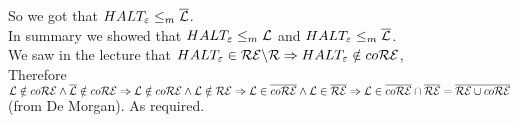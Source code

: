 So we got that \underline{$HALT_\varepsilon \leq_m \overline{\mathcal{L}}$}. \\

In summary we showed that $HALT_\varepsilon \leq_m \mathcal{L}$ and $HALT_\varepsilon \leq_m \overline{\mathcal{L}}$. \\
We saw in the lecture that $HALT_\varepsilon \in \mathcal{R}\mathcal{E} \backslash \mathcal{R} \Rightarrow HALT_\varepsilon \notin co\mathcal{R}\mathcal{E}$, \\
Therefore $\mathcal{L} \notin co\mathcal{R}\mathcal{E} \wedge \overline{\mathcal{L}} \notin co\mathcal{R}\mathcal{E} \Rightarrow \mathcal{L} \notin co\mathcal{R}\mathcal{E} \wedge  \mathcal{L} \notin \mathcal{R}\mathcal{E}
        \Rightarrow \mathcal{L} \in \overline{co\mathcal{R}\mathcal{E}} \wedge \mathcal{L} \in \overline{\mathcal{R}\mathcal{E}} \\
        \Rightarrow \mathcal{L} \in \overline{co\mathcal{R}\mathcal{E}} \cap \overline{\mathcal{R}\mathcal{E}} = \overline{\mathcal{R}\mathcal{E} \cup co\mathcal{R}\mathcal{E}}$ (from De Morgan). As required. \pagebreak


